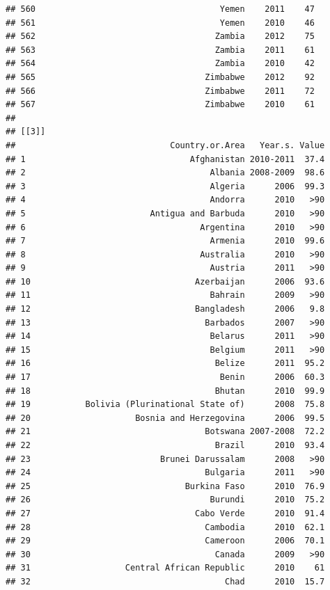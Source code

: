 \documentclass[
]{book}
\begin{document}
\begin{verbatim}
## 560                                     Yemen    2011    47
## 561                                     Yemen    2010    46
## 562                                    Zambia    2012    75
## 563                                    Zambia    2011    61
## 564                                    Zambia    2010    42
## 565                                  Zimbabwe    2012    92
## 566                                  Zimbabwe    2011    72
## 567                                  Zimbabwe    2010    61
## 
## [[3]]
##                               Country.or.Area   Year.s. Value
## 1                                 Afghanistan 2010-2011  37.4
## 2                                     Albania 2008-2009  98.6
## 3                                     Algeria      2006  99.3
## 4                                     Andorra      2010   >90
## 5                         Antigua and Barbuda      2010   >90
## 6                                   Argentina      2010   >90
## 7                                     Armenia      2010  99.6
## 8                                   Australia      2010   >90
## 9                                     Austria      2011   >90
## 10                                 Azerbaijan      2006  93.6
## 11                                    Bahrain      2009   >90
## 12                                 Bangladesh      2006   9.8
## 13                                   Barbados      2007   >90
## 14                                    Belarus      2011   >90
## 15                                    Belgium      2011   >90
## 16                                     Belize      2011  95.2
## 17                                      Benin      2006  60.3
## 18                                     Bhutan      2010  99.9
## 19           Bolivia (Plurinational State of)      2008  75.8
## 20                     Bosnia and Herzegovina      2006  99.5
## 21                                   Botswana 2007-2008  72.2
## 22                                     Brazil      2010  93.4
## 23                          Brunei Darussalam      2008   >90
## 24                                   Bulgaria      2011   >90
## 25                               Burkina Faso      2010  76.9
## 26                                    Burundi      2010  75.2
## 27                                 Cabo Verde      2010  91.4
## 28                                   Cambodia      2010  62.1
## 29                                   Cameroon      2006  70.1
## 30                                     Canada      2009   >90
## 31                   Central African Republic      2010    61
## 32                                       Chad      2010  15.7

\end{verbatim}
\end{document}
